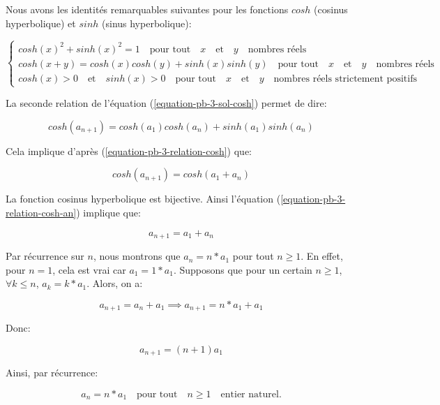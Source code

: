 \documentclass[12pt,a4paper,article]{memoir}
\begin{document}
Nous avons les identités remarquables suivantes pour les fonctions $cosh$ (cosinus hyperbolique) et $sinh$ (sinus hyperbolique):

\begin{equation}
\left\{
	\begin{array}{l}
	cosh(x)^2 + sinh(x)^2 = 1 \quad \textrm{pour tout} \quad x \quad \textrm{et} \quad y \quad \textrm{nombres réels}\\
	cosh(x+y) = cosh(x)cosh(y) +  sinh(x)sinh(y) \quad \textrm{pour tout} \quad x \quad \textrm{et} \quad y \quad \textrm{nombres réels}\\
	cosh(x) > 0 \quad \textrm{et} \quad sinh(x) > 0 \quad \textrm{pour tout} \quad x \quad \textrm{et} \quad y \quad \textrm{nombres réels strictement positifs}
	\end{array}
\right.
\label{equation-pb-3-relation-cosh}
\end{equation}

La seconde relation de l'équation (\ref{equation-pb-3-sol-cosh}) permet de dire:

\[cosh(a_{n+1}) = cosh(a_1)cosh(a_{n}) + sinh(a_1)sinh(a_{n}) \]

Cela implique d'après (\ref{equation-pb-3-relation-cosh}) que:

\begin{equation}
cosh(a_{n+1}) = cosh(a_1 + a_n)
\label{equation-pb-3-relation-cosh-an}
\end{equation}

La fonction cosinus hyperbolique est bijective. Ainsi l'équation (\ref{equation-pb-3-relation-cosh-an}) implique que:

\begin{equation}
a_{n+1} = a_1 + a_n
\label{equation-pb-3-relation-an}
\end{equation}

Par récurrence sur $n$, nous montrons que $a_{n} = n*a_{1}$ pour tout $n \geq 1$. En effet, pour $n=1$, cela est vrai car $a_{1} = 1*a_{1}$. Supposons que pour un certain $n \geq 1$, $\forall k \leq n$, $a_{k} = k*a_{1}$. Alors, on a:

\[a_{n+1} = a_{n} + a_{1} \implies a_{n+1} = n*a_{1} + a_{1}\]

Donc:

\[a_{n+1} = (n+1)a_{1} \]

Ainsi, par récurrence:

\begin{equation}
a_{n} = n*a_{1} \quad \textrm{pour tout} \quad n \geq 1 \quad \textrm{entier naturel}.
\label{equation-pb-3-reccur-an}
\end{equation}
\end{document}
